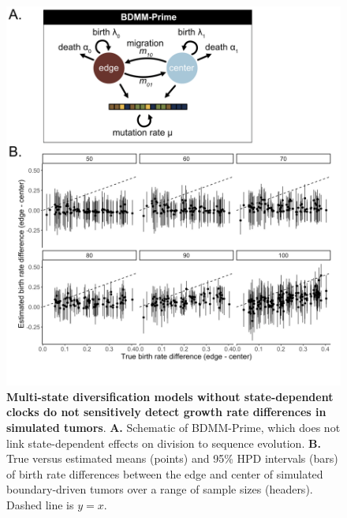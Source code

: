 \documentclass[12pt]{elife_based}
\begin{document}
\begin{figure}
    \includegraphics[width=\textwidth]{figures/fig3_supp.pdf}
    \caption{\textbf{Multi-state diversification models without state-dependent clocks do not sensitively detect growth rate differences in simulated tumors}. \textbf{A.} Schematic of BDMM-Prime, which does not link state-dependent effects on division to sequence evolution. \textbf{B.} True versus estimated means (points) and 95\% HPD intervals (bars) of birth rate differences between the edge and center of simulated boundary-driven tumors over a range of sample sizes (headers). Dashed line is $y=x$.}
\label{figsupp:sf3}
\end{figure} 
\end{document}
